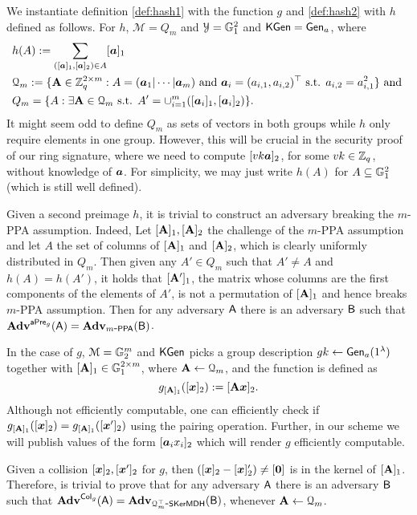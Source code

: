 
We instantiate definition \ref{def:hash1} with the function $g$ and \ref{def:hash2}  with $h$ defined as follows. For  $h$, $\mathcal{M}=Q_m$ and $\mathcal{Y}=\mathbb{G}_1^2$ and $\mathsf{KGen}=\mathsf{Gen}_a$, where
\begin{align*}
&h(A):= \sum_{([{\boldsymbol{a}}]_1,[{\boldsymbol{a}}]_2)\in A}[{\boldsymbol{a}}]_1\\
&\mathcal{Q}_m := \{\mathbf{{A}}\in \mathbb{Z}_q^{2\times m}:A=({\boldsymbol{a}}_1|\cdots|{\boldsymbol{a}}_m) \text{ and } {\boldsymbol{a}}_i = (a_{i,1},a_{i,2})^\top \text{ s.t. } a_{i,2} = a_{i,1}^2\}\text{ and }\\
&Q_m = \{A : \exists \mathbf{{A}}\in\mathcal{Q}_m\text{ s.t. } A' = \cup_{i=1}^m([{\boldsymbol{a}}_i]_1,[{\boldsymbol{a}}_i]_2)\}.
\end{align*}
It might seem odd to define $Q_m$ as sets  of vectors in both groups while $h$ only require elements in one group. However, this will be crucial in the security proof of our ring signature, where we need to compute $[vk {\boldsymbol{a}}]_2$, for some $vk\in\mathbb{Z}_q$, without knowledge of ${\boldsymbol{a}}$. For simplicity, we may just write $h(A)$ for $A\subseteq \mathbb{G}_1^2$ (which is still well defined).

Given a second preimage $h$, it is trivial to construct an adversary breaking the $m$-PPA assumption. Indeed, Let $[\mathbf{{A}}]_1,[\mathbf{{A}}]_2$ the challenge of the $m$-PPA assumption and let $A$ the set of columns of $[\mathbf{{A}}]_1$ and $[\mathbf{{A}}]_2$, which is clearly uniformly distributed in $Q_m$. Then given any $A'\in Q_m$ such that $A'\neq A$ and $h(A)=h(A')$, it holds that $[\mathbf{{A}}']_1$, the matrix whose columns are the first components of the elements of $A'$, is not a permutation of $[\mathbf{{A}}]_1$ and hence breaks $m$-PPA assumption. Then for any adversary $\mathsf{A}$ there is an adversary $\mathsf{B}$ such that $\mathbf{Adv}^{\mathsf{aPre}_g}(\mathsf{A})=\mathbf{Adv}_{m\mbox{-}\mathsf{PPA}}(\mathsf{B})$. 

In the case of $g$, $\mathcal{M}=\mathbb{G}^m_2$ and $\mathsf{KGen}$ picks a group description $gk\gets\mathsf{Gen}_a(1^\lambda)$ together with $[\mathbf{{A}}]_1\in\mathbb{G}^{2\times m}_1$, where $\mathbf{{A}}\gets\mathcal{Q}_m$, and the function is defined as
$$
g_{[\mathbf{{A}}]_1}([{\boldsymbol{x}}]_2):= [\mathbf{{A}}{\boldsymbol{x}}]_2.
$$
Although not efficiently computable, one can efficiently check if $g_{[\mathbf{{A}}]_1}([{\boldsymbol{x}}]_2) = g_{[\mathbf{{A}}]_1}([{\boldsymbol{x}}']_2)$ using the pairing operation. Further, in our scheme we will publish values of the form $[{\boldsymbol{a}}_ix_i]_2$ which will render $g$ efficiently computable.

Given a collision $[{\boldsymbol{x}}]_2,[{\boldsymbol{x}}']_2$ for $g$, then $([{\boldsymbol{x}}]_2-[{\boldsymbol{x}}]'_2)\neq [{\boldsymbol{0}}]$ is in the kernel of $[\mathbf{{A}}]_1$. Therefore, is trivial to prove that for any adversary $\mathsf{A}$ there is an adversary $\mathsf{B}$ such that $\mathbf{Adv}^{\mathsf{Col}_g}(\mathsf{A})=\mathbf{Adv}_{\mathcal{Q}_m^\top\mbox{-}\mathsf{SKerMDH}}(\mathsf{B})$, whenever $\mathbf{{A}}\gets\mathcal{Q}_m$.

